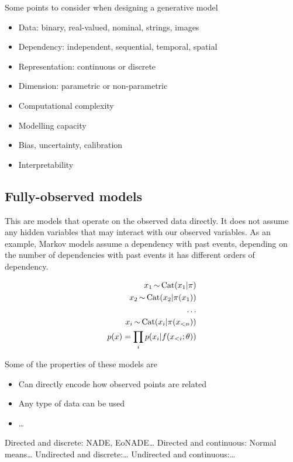 \documentclass[b5paper]{report}
\begin{document}
Some points to consider when designing a generative model

\begin{itemize}
  \item Data: binary, real-valued, nominal, strings, images
  \item Dependency: independent, sequential, temporal, spatial
  \item Representation: continuous or discrete
  \item Dimension: parametric or non-parametric
  \item Computational complexity
  \item Modelling capacity
  \item Bias, uncertainty, calibration
  \item Interpretability
\end{itemize}

\subsection{Fully-observed models}

This are models that operate on the observed data directly. It does not assume
any hidden variables that may interact with our observed variables. As an
example, Markov models assume a dependency with past events, depending on the
number of dependencies with past events it has different orders of dependency.

\begin{align}
  x_1 \operatorname*{\sim} \text{Cat}(x_1|\pi) \\
  x_2 \operatorname*{\sim} \text{Cat}(x_2|\pi(x_1)) \\
  \dots \\
  x_i \operatorname*{\sim} \text{Cat}(x_i|\pi(x_{< n})) \\
  p(x) = \prod_i p(x_i|f(x_{< i}; \theta))
\end{align}

Some of the properties of these models are

\begin{itemize}
  \item Can directly encode how observed points are related
  \item Any type of data can be used
  \item \dots
\end{itemize}

Directed and discrete: NADE, EoNADE\dots
Directed and continuous: Normal means\dots
Undirected and discrete:\dots
Undirected and continuous:\dots
\end{document}
